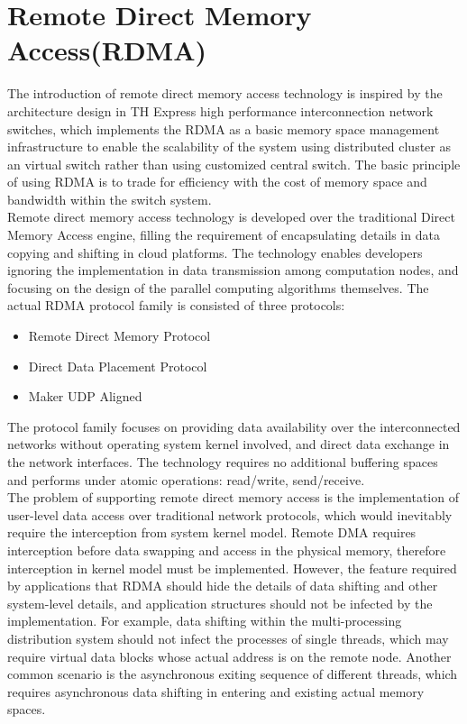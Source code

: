 \documentclass[11pt,openright,a4paper]{report}
\begin{document}
\section{Remote Direct Memory Access(RDMA)}
The introduction of remote direct memory access technology is inspired by the architecture design in TH Express high performance interconnection network switches, which implements the RDMA as a basic memory space management infrastructure to enable the scalability of the system using distributed cluster as an virtual switch rather than using customized central switch. The basic principle of using RDMA is to trade for efficiency with the cost of memory space and bandwidth within the switch system.\\ 
Remote direct memory access technology is developed over the traditional Direct Memory Access engine, filling the requirement of encapsulating details in data copying and shifting in cloud platforms\cite{archer2012remote}. The technology enables developers ignoring the implementation in data transmission among computation nodes, and focusing on the design of the parallel computing algorithms themselves. The actual RDMA protocol family is consisted of three protocols:
\begin{itemize}
	\item Remote Direct Memory Protocol
	\item Direct Data Placement Protocol
	\item Maker UDP Aligned
\end{itemize}
The protocol family focuses on providing data availability over the interconnected networks without operating system kernel involved, and direct data exchange in the network interfaces. The technology requires no additional buffering spaces and performs under atomic operations: read/write, send/receive\cite{RobertRDMAintro}. \\
The problem of supporting remote direct memory access is the implementation of user-level data access over traditional network protocols, which would inevitably require the interception from system kernel model\cite{liu2004high}. Remote DMA requires interception before data swapping and access in the physical memory, therefore interception in kernel model must be implemented. However, the feature required by applications that RDMA should hide the details of data shifting and other system-level details, and application structures should not be infected by the implementation. For example, data shifting within the multi-processing distribution system should not infect the processes of single threads, which may require virtual data blocks whose actual address is on the remote node. Another common scenario is the asynchronous exiting sequence of different threads, which requires asynchronous data shifting in entering and existing actual memory spaces. \\
\end{document}
